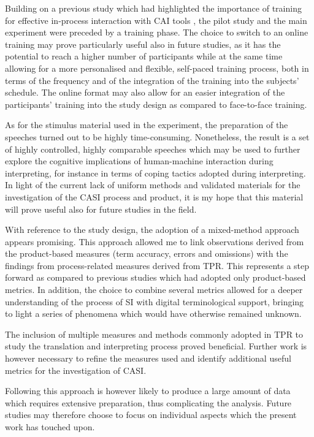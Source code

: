 Building on a previous study which had highlighted the importance of training for effective in-process interaction with CAI tools \citep{prandi_uso_2015,prandi_use_2015}, the pilot study and the main experiment were preceded by a training phase. The choice to switch to an online training may prove particularly useful also in future studies, as it has the potential to reach a higher number of participants while at the same time allowing for a more personalised and flexible, self-paced training process, both in terms of the frequency and of the integration of the training into the subjects' schedule. The online format may also allow for an easier integration of the participants' training into the study design as compared to face-to-face training.

As for the stimulus material used in the experiment, the preparation of the speeches turned out to be highly time-consuming. Nonetheless, the result is a set of highly controlled, highly comparable speeches which may be used to further explore the cognitive implications of human-machine interaction during interpreting, for instance in terms of coping tactics adopted during interpreting. In light of the current lack of uniform methods and validated materials for the investigation of the CASI process and product, it is my hope that this material will prove useful also for future studies in the field.

With reference to the study design, the adoption of a mixed-method approach appears promising. This approach allowed me to link observations derived from the product-based measures (term accuracy, errors and omissions) with the findings from process-related measures derived from TPR. This represents a step forward as compared to previous studies which had adopted only product-based metrics. In addition, the choice to combine several metrics allowed for a deeper understanding of the process of SI with digital terminological support, bringing to light a series of phenomena which would have otherwise remained unknown.

The inclusion of multiple measures and methods commonly adopted in TPR to study the translation and interpreting process proved beneficial. Further work is however necessary to refine the measures used and identify additional useful metrics for the investigation of CASI.

\begin{sloppypar}
Following this approach is however likely to produce a large amount of data which requires extensive preparation, thus complicating the analysis. Future studies may therefore choose to focus on individual aspects which the present work has touched upon.
\end{sloppypar}

